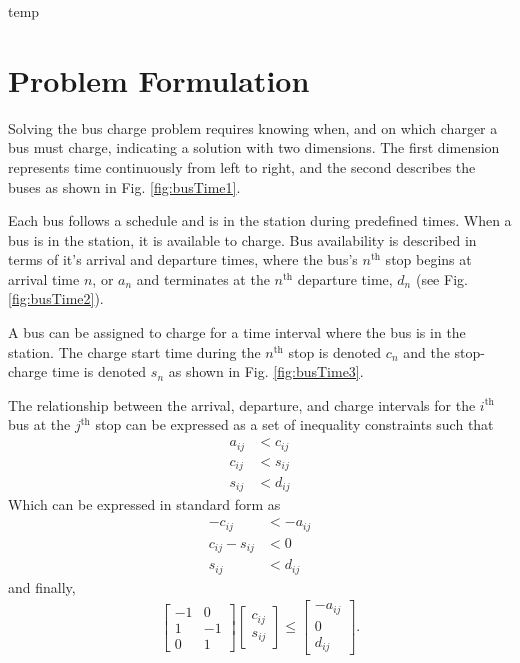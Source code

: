 \newpage temp \newpage
\section{Problem Formulation}
Solving the bus charge problem requires knowing when, and on which charger a bus must charge, indicating a solution with two dimensions.  The first dimension represents time continuously from left to right, and the second describes the buses as shown in Fig. \ref{fig:busTime1}.

\par Each bus follows a schedule and is in the station during predefined times. When a bus is in the station, it is available to charge.  Bus availability is described in terms of it's arrival and departure times, where the bus's $n^{\text{th}}$ stop begins at arrival time $n$, or $a_n$ and terminates at the $n^{\text{th}}$ departure time, $d_n$ (see Fig. \ref{fig:busTime2}). 

\par A bus can be assigned to charge for a time interval where the bus is in the station. The charge start time during the $n^{\text{th}}$ stop is denoted $c_n$ and the stop-charge time is denoted $s_n$ as shown in Fig. \ref{fig:busTime3}. 

The relationship between the arrival, departure, and charge intervals for the $i^{\text{th}}$ bus at the $j^{\text{th}}$ stop can be expressed as a set of inequality constraints such that
\begin{align}
	a_{ij} &< c_{ij} \\
	c_{ij} &< s_{ij} \\
	s_{ij} &< d_{ij}
\end{align}
Which can be expressed in standard form as
\begin{align}
	-c_{ij} &< -a_{ij}\\
	c_{ij} - s_{ij} &< 0\\
	s_{ij} &< d_{ij}
\end{align}
and finally, 
\begin{align}\label{eqn:timeConstraint}
	\begin{bmatrix} -1 & 0 \\
	                 1 & -1 \\
		0 & 1\end{bmatrix} \begin{bmatrix} c_{ij} \\ s_{ij}\end{bmatrix} \le \begin{bmatrix}-a_{ij} \\ 0 \\ d_{ij} \end{bmatrix}.
\end{align}

